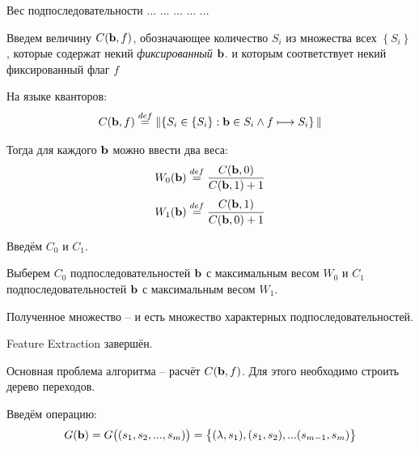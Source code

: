 \begin{frame}{Вес подпоследовательности}
	\small
	... ... ... ... ...
	
	Введем величину $C(\bold b, f)$, обозначающее количество $S_i$ из множества всех $\left\{ S_i \right\}$,
	которые содержат некий \textit{фиксированный} $\bold b$. 
	и которым соответствует некий фиксированный флаг $f$  
	
	На языке кванторов:
	\begin{equation}
	C(\bold b, f) \stackrel{def}{=} \lVert
		\left\{ 
			S_i \in  \left\{S_i\right\}   : \bold b \in S_i 
			\wedge f \longmapsto S_i
		\right\}
	\lVert
	\end{equation}
	
	Тогда для каждого $\bold b$ можно ввести два веса:
	\begin{equation}\label{eq:W_0_simple}
	W_0 (\bold b) \stackrel{def}{=} \frac{C(\bold b, 0)}{C(\bold b, 1) + 1}
	\end{equation}
	\begin{equation}\label{eq:W_1_simple}
	W_1 (\bold b) \stackrel{def}{=} \frac{C(\bold b, 1)}{C(\bold b, 0) + 1}
	\end{equation}
\end{frame}

\begin{frame}
	Введём  $C_0$ и $C_1$.
	
	Выберем $C_0$ подпоследовательностей $\bold b$ с максимальным весом $W_0$
	и $C_1$ подпоследовательностей $\bold b$ с максимальным весом $W_1$.
	
	Полученное множество -- и есть множество характерных подпоследовательностей.
	
	Feature Extraction завершён.

\end{frame}
	
\begin{frame}
	Основная проблема алгоритма -- расчёт $C(\bold b, f)$. Для этого необходимо строить дерево переходов. 
	
	Введём операцию:
	\begin{equation}
	G(\bold b) = G\big( (s_1, s_2, ..., s_m) \big)
	= \big\{ (\lambda, s_1), (s_1, s_2), ... (s_{m-1}, s_m) \big\}
	\end{equation}
\end{frame}

